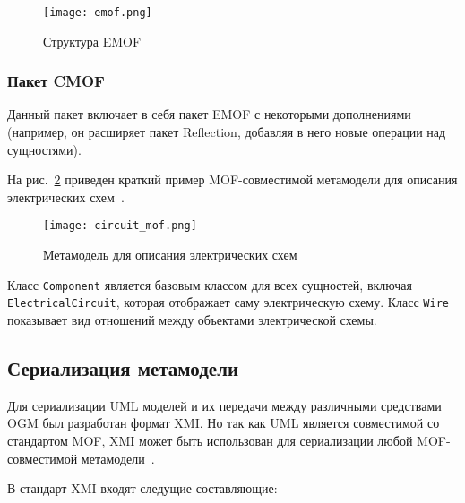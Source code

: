 \begin{figure}[ht]
    \begin{center}
        \texttt{[image: emof.png]}
    \end{center}
    \caption{Структура EMOF}
    \label{fig:emof}
\end{figure}
\newpage

\subsubsection{Пакет CMOF}


Данный пакет включает в себя пакет EMOF с некоторыми дополнениями  (например, он
расширяет пакет Reflection, добавляя в него новые операции над сущностями).

На рис.~\ref{fig:circuit_mof} приведен краткий пример MOF-совместимой метамодели
для описания электрических схем~\cite{essay57286}.

\begin{figure}[ht]
    \begin{center}
        \texttt{[image: circuit\_mof.png]}
    \end{center}
    \caption{Метамодель для описания электрических схем}
    \label{fig:circuit_mof}
\end{figure}

Класс \texttt{Component} является базовым классом для всех сущностей, включая
\texttt{ElectricalCircuit}, которая отображает саму электрическую схему. Класс
\texttt{Wire} показывает вид отношений между объектами электрической схемы.

\subsection{Сериализация метамодели}


Для сериализации UML моделей и их передачи между различными средствами OGM был
разработан формат XMI. Но так как UML является совместимой со стандартом MOF,
XMI может быть использован для сериализации любой MOF-совместимой
метамодели~\cite{standard/XMI}.

В стандарт XMI входят следущие составляющие:

